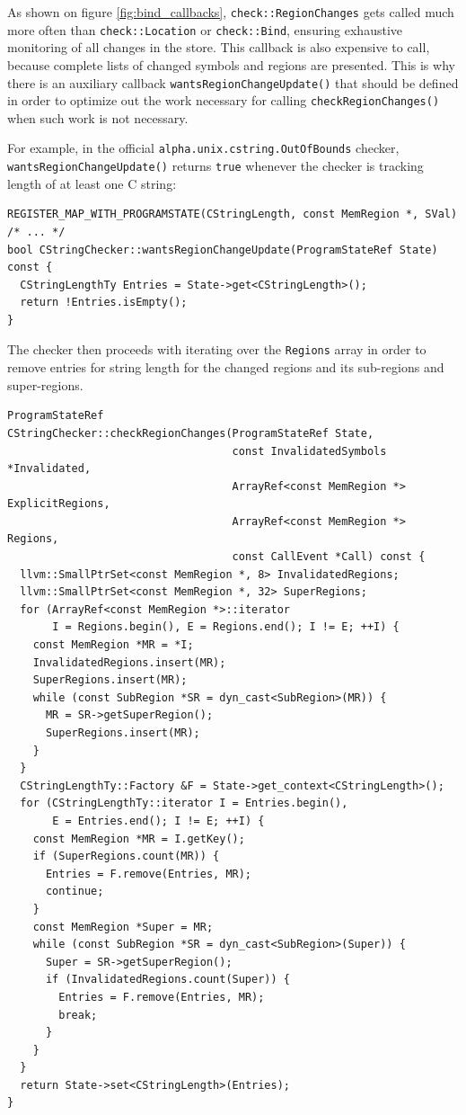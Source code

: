 \documentclass[a4paper,12pt]{article}
\newenvironment{nobr}{\begin{minipage}{\textwidth}\setlength\parskip{1em}
}{\end{minipage}\ignorespacesafterend}
\begin{document}
As shown on figure \ref{fig:bind_callbacks}, \lstinline|check::RegionChanges| gets called much more often than \lstinline|check::Location| or \lstinline|check::Bind|, ensuring exhaustive monitoring of all changes in the store. This callback is also expensive to call, because complete lists of changed symbols and regions are presented. This is why there is an auxiliary callback \lstinline|wantsRegionChangeUpdate()| that should be defined in order to optimize out the work necessary for calling \lstinline|checkRegionChanges()| when such work is not necessary.

\begin{nobr}
For example, in the official \lstinline|alpha.unix.cstring.OutOfBounds| checker, \lstinline|wantsRegionChangeUpdate()| returns \lstinline|true| whenever the checker is tracking length of at least one C string:

\begin{lstlisting}[style=cplusplus]
REGISTER_MAP_WITH_PROGRAMSTATE(CStringLength, const MemRegion *, SVal)
/* ... */
bool CStringChecker::wantsRegionChangeUpdate(ProgramStateRef State) const {
  CStringLengthTy Entries = State->get<CStringLength>();
  return !Entries.isEmpty();
}
\end{lstlisting}
\end{nobr}

The checker then proceeds with iterating over the \lstinline|Regions| array in order to remove entries for string length for the changed regions and its sub-regions and super-regions.

\begin{nobr}
\begin{lstlisting}[style=cplusplus]
ProgramStateRef
CStringChecker::checkRegionChanges(ProgramStateRef State,
                                   const InvalidatedSymbols *Invalidated,
                                   ArrayRef<const MemRegion *> ExplicitRegions,
                                   ArrayRef<const MemRegion *> Regions,
                                   const CallEvent *Call) const {
  llvm::SmallPtrSet<const MemRegion *, 8> InvalidatedRegions;
  llvm::SmallPtrSet<const MemRegion *, 32> SuperRegions;
  for (ArrayRef<const MemRegion *>::iterator
       I = Regions.begin(), E = Regions.end(); I != E; ++I) {
    const MemRegion *MR = *I;
    InvalidatedRegions.insert(MR);
    SuperRegions.insert(MR);
    while (const SubRegion *SR = dyn_cast<SubRegion>(MR)) {
      MR = SR->getSuperRegion();
      SuperRegions.insert(MR);
    }
  }
  CStringLengthTy::Factory &F = State->get_context<CStringLength>();
  for (CStringLengthTy::iterator I = Entries.begin(),
       E = Entries.end(); I != E; ++I) {
    const MemRegion *MR = I.getKey();
    if (SuperRegions.count(MR)) {
      Entries = F.remove(Entries, MR);
      continue;
    }
    const MemRegion *Super = MR;
    while (const SubRegion *SR = dyn_cast<SubRegion>(Super)) {
      Super = SR->getSuperRegion();
      if (InvalidatedRegions.count(Super)) {
        Entries = F.remove(Entries, MR);
        break;
      }
    }
  }
  return State->set<CStringLength>(Entries);
}
\end{lstlisting}
\end{nobr}
\end{document}
